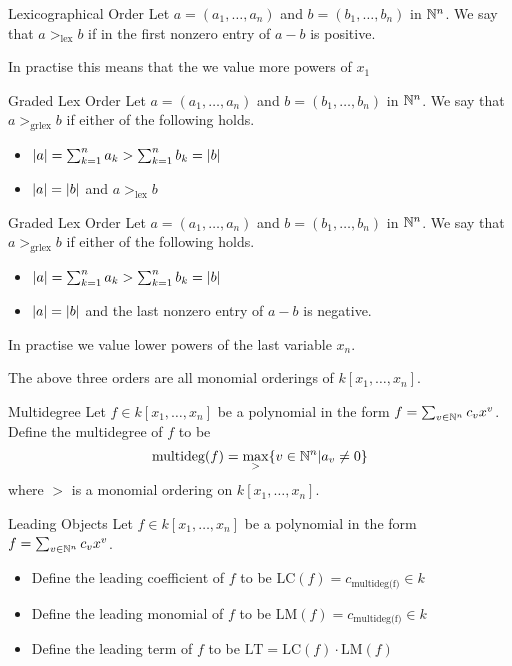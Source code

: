 \documentclass[a4paper]{article}
\begin{document}
\begin{defn}{Lexicographical Order}{} Let $a=(a_1,\dots,a_n)$ and $b=(b_1,\dots,b_n)$ in $\mathbb{N}^n$. We say that $a>_{\text{lex}}b$ if in the first nonzero entry of $a-b$ is positive. 
\end{defn}

In practise this means that the we value more powers of $x_1$

\begin{defn}{Graded Lex Order}{} Let $a=(a_1,\dots,a_n)$ and $b=(b_1,\dots,b_n)$ in $\mathbb{N}^n$. We say that $a>_{\text{grlex}}b$ if either of the following holds. 
\begin{itemize}
\item $\abs{a}=\sum_{k=1}^na_k>\sum_{k=1}^nb_k=\abs{b}$
\item $\abs{a}=\abs{b}$ and $a>_{\text{lex}}b$
\end{itemize}
\end{defn}

\begin{defn}{Graded Lex Order}{} Let $a=(a_1,\dots,a_n)$ and $b=(b_1,\dots,b_n)$ in $\mathbb{N}^n$. We say that $a>_{\text{grlex}}b$ if either of the following holds. 
\begin{itemize}
\item $\abs{a}=\sum_{k=1}^na_k>\sum_{k=1}^nb_k=\abs{b}$
\item $\abs{a}=\abs{b}$ and the last nonzero entry of $a-b$ is negative. 
\end{itemize}
\end{defn}

In practise we value lower powers of the last variable $x_n$. 

\begin{prp}{}{} The above three orders are all monomial orderings of $k[x_1,\dots,x_n]$. 
\end{prp}

\begin{defn}{Multidegree}{} Let $f\in k[x_1,\dots,x_n]$ be a polynomial in the form $f=\sum_{v\in\mathbb{N}^n}c_vx^v$. Define the multidegree of $f$ to be $$\text{multideg}(f)=\max_>\{v\in\mathbb{N}^n|a_v\neq 0\}$$ where $>$ is a monomial ordering on $k[x_1,\dots,x_n]$. 
\end{defn}

\begin{defn}{Leading Objects}{} Let $f\in k[x_1,\dots,x_n]$ be a polynomial in the form $f=\sum_{v\in\mathbb{N}^n}c_vx^v$. 
\begin{itemize}
\item Define the leading coefficient of $f$ to be $\text{LC}(f)=c_\text{multideg(f)}\in k$
\item Define the leading monomial of $f$ to be $\text{LM}(f)=c_\text{multideg(f)}\in k$
\item Define the leading term of $f$ to be $\text{LT}=\text{LC}(f)\cdot\text{LM}(f)$
\end{itemize}
\end{defn}
\end{document}
